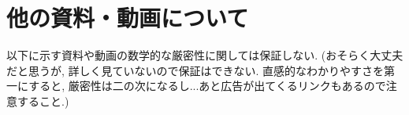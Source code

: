 \documentclass[dvipdfmx,a4paper,11pt]{article}
\theoremstyle{definition}
\newtheorem{exa}[thm]{例}
\begin{document}

 \section{他の資料・動画について}
 
 以下に示す資料や動画の数学的な厳密性に関しては保証しない.
 (おそらく大丈夫だと思うが, 詳しく見ていないので保証はできない. 直感的なわかりやすさを第一にすると, 厳密性は二の次になるし...あと広告が出てくるリンクもあるので注意すること.)
 
\end{document}
